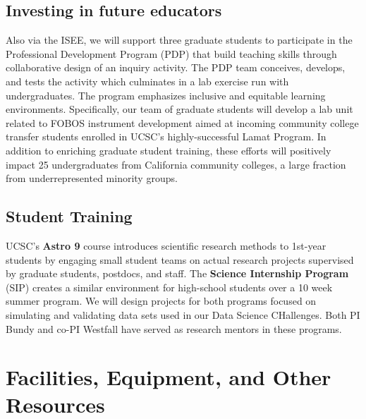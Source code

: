 \documentclass[oneside,11pt]{amsart}
\begin{document}
\subsection{Investing in future educators} Also via the ISEE, we will
support three graduate students to participate in the Professional
Development Program (PDP) that build teaching skills through
collaborative design of an inquiry activity.  The PDP team conceives,
develops, and tests the activity which culminates in a lab exercise
run with undergraduates. The program
emphasizes inclusive and equitable learning environments.  Specifically, our team of graduate
students will develop a lab unit related to FOBOS instrument development aimed at
incoming community college transfer students enrolled in UCSC's
highly-successful Lamat Program.  In addition to enriching graduate
student training, these efforts will positively impact 25
undergraduates from California community colleges, a large fraction
from underrepresented minority groups.

\subsection{Student Training} UCSC's {\bf Astro 9} course introduces scientific research methods to 1st-year students
by engaging small student teams on actual research projects supervised by graduate students,
postdocs, and staff.  The {\bf Science Internship Program} (SIP) creates a similar environment for high-school students
 over a 10 week summer program.  We will design projects for both programs focused on simulating and
 validating data sets used in our Data Science CHallenges.  Both PI Bundy and co-PI Westfall have
 served as research mentors in these programs.

\newpage

\setcounter{page}{1}



\newpage

\setcounter{page}{1}

\section{Facilities, Equipment, and Other Resources}
\end{document}
